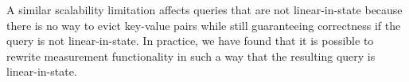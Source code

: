 A similar scalability limitation affects queries that are not linear-in-state
because there is no way to evict key-value pairs while still guaranteeing
correctness if the query is not linear-in-state. In practice, we have found
that it is possible to rewrite measurement functionality in such a way that the
resulting query is linear-in-state.
